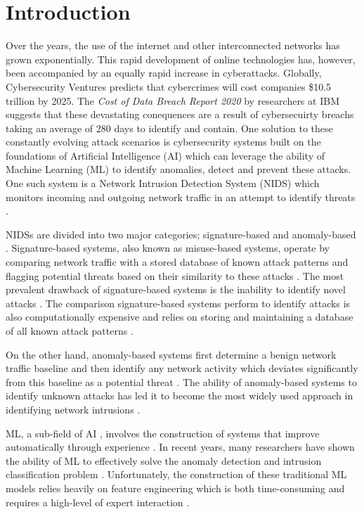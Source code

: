 \documentclass[conference]{IEEEtran}
\begin{document}
\section{Introduction}
Over the years, the use of the internet and other interconnected networks has grown exponentially. This rapid development of online technologies has, however, been accompanied by an equally rapid increase in cyberattacks. Globally, Cybersecurity Ventures predicts that cybercrimes will cost companies \$10.5 trillion by 2025. The \textit{Cost of Data Breach Report 2020} by researchers at IBM suggests that these devastating conequences are a result of cybersecuirty breachs taking an average of 280 days to identify and contain.
One solution to these constantly evolving attack scenarios is cybersecurity systems built on the foundations of Artificial Intelligence (AI) which can leverage the ability of Machine Learning (ML) to identify anomalies, detect and prevent these attacks. One such system is a Network Intrusion Detection System (NIDS) which monitors incoming and outgoing network traffic in an attempt to identify threats \cite{b1}.

NIDSs are divided into two major categories; signature-based and anomaly-based \cite{b2}. Signature-based systems, also known as misuse-based systems, operate by comparing network traffic with a stored database of known attack patterns and flagging potential threats based on their similarity to these attacks \cite{b3}. The most prevalent drawback of signature-based systems is the inability to identify novel attacks \cite{b1}. The comparison signature-based systems perform to identify attacks is also computationally expensive and relies on storing and maintaining a database of all known attack patterns \cite{b4}.

On the other hand, anomaly-based systems first determine a benign network traffic baseline and then identify any network activity which deviates significantly from this baseline as a potential threat \cite{b5}. The ability of anomaly-based systems to identify unknown attacks has led it to become the most widely used approach in identifying network intrusions \cite{b6}.

ML, a sub-field of AI , involves the construction of systems that improve automatically through experience \cite{b7}. In recent years, many researchers have shown the ability of ML to effectively solve the anomaly detection and intrusion classification problem \cite{b8}. Unfortunately, the construction of these traditional ML models relies heavily on feature engineering which is both time-consuming and requires a high-level of expert interaction \cite{b9}. 
\end{document}
